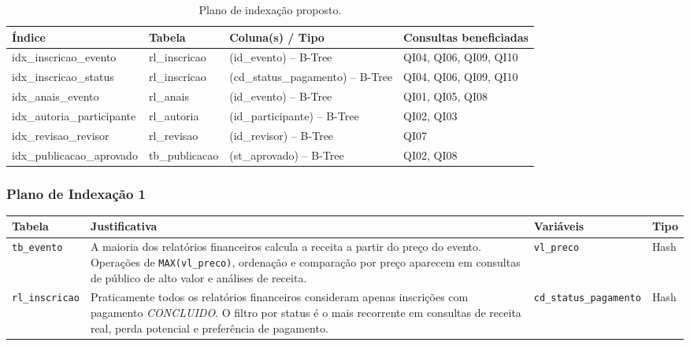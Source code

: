 \documentclass[12pt,a4paper]{article}
\begin{document}
\begin{table}[htb]
\centering
\caption{Plano de indexação proposto.}
\label{tab:indices}
\small
\begin{tabularx}{\textwidth}{|l|l|l|X|}
\hline
\textbf{Índice} & \textbf{Tabela} & \textbf{Coluna(s) / Tipo} & \textbf{Consultas beneficiadas} \\
\hline
idx\_inscricao\_evento    & rl\_inscricao    & (id\_evento) -- B-Tree       & QI04, QI06, QI09, QI10 \\
idx\_inscricao\_status    & rl\_inscricao    & (cd\_status\_pagamento) -- B-Tree & QI04, QI06, QI09, QI10 \\
idx\_anais\_evento        & rl\_anais        & (id\_evento) -- B-Tree       & QI01, QI05, QI08 \\
idx\_autoria\_participante & rl\_autoria     & (id\_participante) -- B-Tree & QI02, QI03 \\
idx\_revisao\_revisor     & rl\_revisao      & (id\_revisor) -- B-Tree      & QI07 \\
idx\_publicacao\_aprovado & tb\_publicacao   & (st\_aprovado) -- B-Tree     & QI02, QI08 \\
\hline
\end{tabularx}
\end{table}

\subsubsection*{Plano de Indexação 1}
\begin{tabularx}{\textwidth}{|l|X|l|l|}
\hline
\textbf{Tabela} & \textbf{Justificativa} & \textbf{Variáveis} & \textbf{Tipo} \\
\hline
\texttt{tb\_evento} & A maioria dos relatórios financeiros calcula a receita a partir do preço do evento. Operações de \texttt{MAX(vl\_preco)}, ordenação e comparação por preço aparecem em consultas de público de alto valor e análises de receita. & \texttt{vl\_preco} & Hash \\
\hline
\texttt{rl\_inscricao} & Praticamente todos os relatórios financeiros consideram apenas inscrições com pagamento \textit{CONCLUIDO}. O filtro por status é o mais recorrente em consultas de receita real, perda potencial e preferência de pagamento. & \texttt{cd\_status\_pagamento} & Hash \\
\hline
\end{tabularx}

\bigskip
\end{document}
